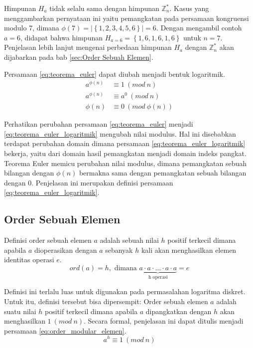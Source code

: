 Himpunan $ H_a $ tidak selalu sama dengan himpunan $ \mathbb{Z}_n^{*} $. Kasus yang menggambarkan pernyataan ini yaitu pemangkatan pada persamaan kongruensi modulo 7, dimana $ \phi(7)=\left|\left\{1,2,3,4,5,6\right\}\right|\allowbreak=6 $. Dengan mengambil contoh $ a=6 $, didapat bahwa himpunan $ H_{a=6}=\left\{1,6,1,6,1,6\right\} $ untuk $ n=7 $. Penjelasan lebih lanjut mengenai perbedaan himpunan $ H_a $ dengan $ \mathbb{Z}_n^{*} $ akan dijabarkan pada bab \ref{sec:Order Sebuah Elemen}.

Persamaan \eqref{eq:teorema_euler} dapat diubah menjadi bentuk logaritmik.
\begin{align}
a^{\phi(n)} &\equiv 1\ (mod\ n) \\
a^{\phi(n)} &\equiv a^0\ (mod\ n) \\
\phi(n) &\equiv 0\ (mod\ \phi(n))
\label{eq:teorema_euler_logaritmik}
\end{align}

Perhatikan perubahan persamaan \eqref{eq:teorema_euler} menjadi \eqref{eq:teorema_euler_logaritmik} mengubah nilai modulus. Hal ini disebabkan terdapat perubahan domain dimana persamaan \eqref{eq:teorema_euler_logaritmik} bekerja, yaitu dari domain hasil pemangkatan menjadi domain indeks pangkat. Teorema Euler memicu perubahan nilai modulus, dimana pemangkatan sebuah bilangan dengan $ \phi(n) $ bermakna sama dengan pemangkatan sebuah bilangan dengan $ 0 $. Penjelasan ini merupakan definisi persamaan \eqref{eq:teorema_euler_logaritmik}.

\subsection{Order Sebuah Elemen}

Definisi order sebuah elemen $ a $ adalah sebuah nilai $ h $ positif terkecil dimana apabila $ a $ dioperasikan dengan $ a $ sebanyak $ h $ kali akan menghasilkan elemen identitas operasi $ e $.\cite{harald_applied_number_theory}
\begin{equation}
ord(a)=h,\text{ dimana }\underbrace{a\cdot a\cdot\ldots\cdot a\cdot a}_{\text{h operasi}}=e
\label{eq:order_elemen}
\end{equation}

Definisi ini terlalu luas untuk digunakan pada permasalahan logaritma diskret. Untuk itu, definisi tersebut bisa dipersempit: Order sebuah elemen $ a $ adalah suatu nilai $ h $ positif terkecil dimana apabila $ a $ dipangkatkan dengan $ h $ akan menghasilkan $ 1\ (mod\ n) $. Secara formal, penjelasan ini dapat ditulis menjadi persamaan \eqref{eq:order_modular_elemen}.
\begin{equation}
a^h\equiv 1\ (mod\ n)
\label{eq:order_modular_elemen}
\end{equation}

